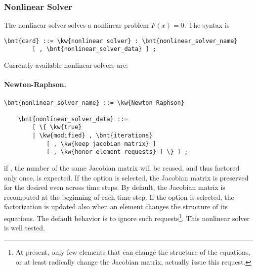 \subsubsection{Nonlinear Solver}
The nonlinear solver solves a nonlinear problem $F(x)=0$.
The syntax is
\begin{Verbatim}[commandchars=\\\{\}]
    \bnt{card} ::= \kw{nonlinear solver} : \bnt{nonlinear_solver_name}
        [ , \bnt{nonlinear_solver_data} ] ;
\end{Verbatim}
Currently available nonlinear solvers are:

\paragraph{Newton-Raphson.}
\begin{Verbatim}[commandchars=\\\{\}]
    \bnt{nonlinear_solver_name} ::= \kw{Newton Raphson}

    \bnt{nonlinear_solver_data} ::=
        [ \{ \kw{true}
        | \kw{modified} , \bnt{iterations}
            [ , \kw{keep jacobian matrix} ]
            [ , \kw{honor element requests} ] \} ] ;
\end{Verbatim}
if , the number of  the same Jacobian matrix 
will be reused, and thus factored only once, is expected.
If the option  is selected,
the Jacobian matrix is preserved
for the desired  even across time steps.
By default, the Jacobian matrix is recomputed at the beginning 
of each time step.
If the option  is selected, the factorization
is updated also when an element changes the structure of its equations.
The default behavior is to ignore such requests\footnote{
	At present, only few elements that can change the structure
	of the equations, or at least radically change the Jacobian matrix,
	actually issue this request.
}.
This nonlinear solver is well tested.

